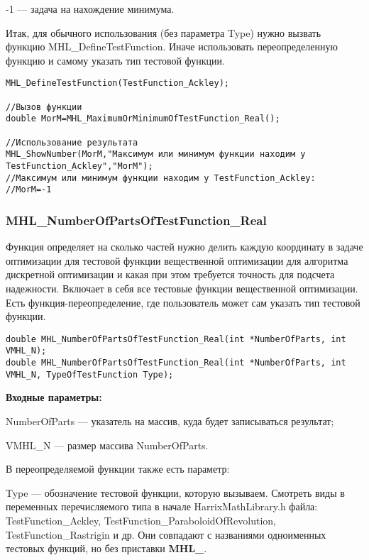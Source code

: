 \documentclass[a4paper,12pt]{article}
\begin{document}
-1 --- задача на нахождение минимума.

Итак, для обычного использования (без параметра Type) нужно вызвать функцию MHL\_DefineTestFunction. Иначе использовать переопределенную функцию и самому указать тип тестовой функции.


\begin{lstlisting}[label=code_use_MHL_MaximumOrMinimumOfTestFunction_Real,caption=Пример использования]
MHL_DefineTestFunction(TestFunction_Ackley);

//Вызов функции
double MorM=MHL_MaximumOrMinimumOfTestFunction_Real();

//Использование результата
MHL_ShowNumber(MorM,"Максимум или минимум функции находим у TestFunction_Ackley","MorM");
//Максимум или минимум функции находим у TestFunction_Ackley:
//MorM=-1
\end{lstlisting}

\subsubsection{MHL\_NumberOfPartsOfTestFunction\_Real}\label{MHL_NumberOfPartsOfTestFunction_Real}

Функция определяет на сколько частей нужно делить каждую координату в задаче оптимизации для тестовой функции вещественной оптимизации для алгоритма дискретной оптимизации и какая при этом требуется точность для подсчета надежности. Включает в себя все тестовые функции вещественной оптимизации. Есть функция-переопределение, где пользователь может сам указать тип тестовой функции.


\begin{lstlisting}[label=code_syntax_MHL_NumberOfPartsOfTestFunction_Real,caption=Синтаксис]
double MHL_NumberOfPartsOfTestFunction_Real(int *NumberOfParts, int VMHL_N);
double MHL_NumberOfPartsOfTestFunction_Real(int *NumberOfParts, int VMHL_N, TypeOfTestFunction Type);
\end{lstlisting}

\textbf{Входные параметры:}

NumberOfParts --- указатель на массив, куда будет записываться результат;

VMHL\_N --- размер массива NumberOfParts.

В переопределяемой функции также есть параметр:
  
Type --- обозначение тестовой функции, которую вызываем.
Смотреть виды в переменных перечисляемого типа в начале HarrixMathLibrary.h файла: TestFunction\_Ackley, TestFunction\_ParaboloidOfRevolution, TestFunction\_Rastrigin и др. Они совпадают с названиями одноименных тестовых функций, но без приставки \textbf{MHL\_}.
\end{document}
